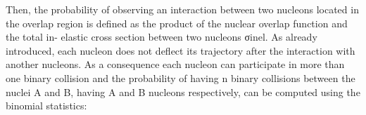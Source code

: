 
Then, the probability of observing an interaction between two nucleons located in the overlap region is defined as the product of the nuclear overlap function and the total in- elastic cross section between two nucleons σinel. As already introduced, each nucleon does not deflect its trajectory after the interaction with another nucleons. As a consequence each nucleon can participate in more than one binary collision and the probability of having n binary collisions between the nuclei A and B, having A and B nucleons respectively, can be computed using the binomial statistics: